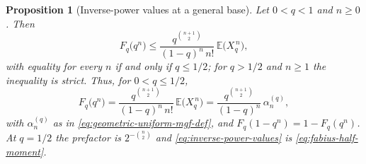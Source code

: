 \documentclass[11pt,oneside,openany]{book}
\newtheorem{proposition}[proposition]{Proposition}
\theoremstyle{definition}
\theoremstyle{remark}
\begin{document}

\begin{proposition}[Inverse-power values at a general base]\label{prop:inverse-power-values}
Let $0<q<1$ and $n\ge0$.  Then
\begin{equation}\label{eq:inverse-power-inequality}
 F_q\bigl(q^n\bigr)\le\frac{q^{\binom{n+1}{2}}}{(1-q)^n\,n!}\,\mathbb E\bigl(X_q^{\,n}\bigr),
\end{equation}
with equality for every $n$ if and only if $q\le1/2$; for $q>1/2$ and $n\ge1$ the
inequality is strict.  Thus, for $0<q\le1/2$,
\begin{equation}\label{eq:inverse-power-values}
 F_q\bigl(q^n\bigr)
 =\frac{q^{\binom{n+1}{2}}}{(1-q)^n\,n!}\,\mathbb E\bigl(X_q^{\,n}\bigr)
 =\frac{q^{\binom{n+1}{2}}}{(1-q)^n}\,\alpha^{(q)}_n ,
\end{equation}
with $\alpha^{(q)}_n$ as in \eqref{eq:geometric-uniform-mgf-def}, and
$F_q(1-q^n)=1-F_q(q^n)$.  At $q=1/2$ the prefactor is $2^{-\binom n2}$ and
\eqref{eq:inverse-power-values} is \eqref{eq:fabius-half-moment}.
\end{proposition}
\end{document}
